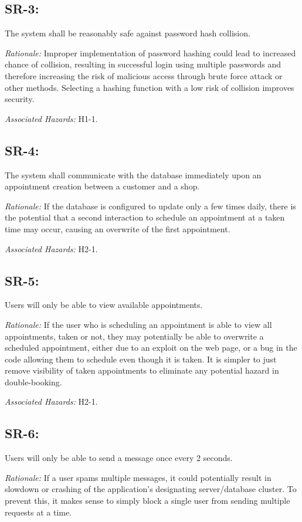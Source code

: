 \documentclass{article}
\begin{document}
\subsection*{SR-3:}
The system shall be reasonably safe against password hash collision.

\emph{Rationale: }Improper implementation of password hashing could lead to increased chance of collision, resulting in successful login using multiple passwords and therefore increasing the risk of malicious access through brute force attack or other methods. Selecting a hashing function with a low risk of collision improves security.

\emph{Associated Hazards: }H1-1.

\subsection*{SR-4:}
The system shall communicate with the database immediately upon an appointment creation between a customer and a shop.

\emph{Rationale: }If the database is configured to update only a few times daily, there is the potential that a second interaction to schedule an appointment at a taken time may occur, causing an overwrite of the first appointment. 

\emph{Associated Hazards: }H2-1.

\subsection*{SR-5:}
Users will only be able to view available appointments.

\emph{Rationale: }If the user who is scheduling an appointment is able to view all appointments, taken or not, they may potentially be able to overwrite a scheduled appointment, either due to an exploit on the web page, or a bug in the code allowing them to schedule even though it is taken. It is simpler to just remove visibility of taken appointments to eliminate any potential hazard in double-booking.

\emph{Associated Hazards: }H2-1.

\subsection*{SR-6:}
Users will only be able to send a message once every 2 seconds.

\emph{Rationale: }If a user spams multiple messages, it could potentially result in slowdown or crashing of the application's designating server/database cluster. To prevent this, it makes sense to simply block a single user from sending multiple requests at a time.
\end{document}
